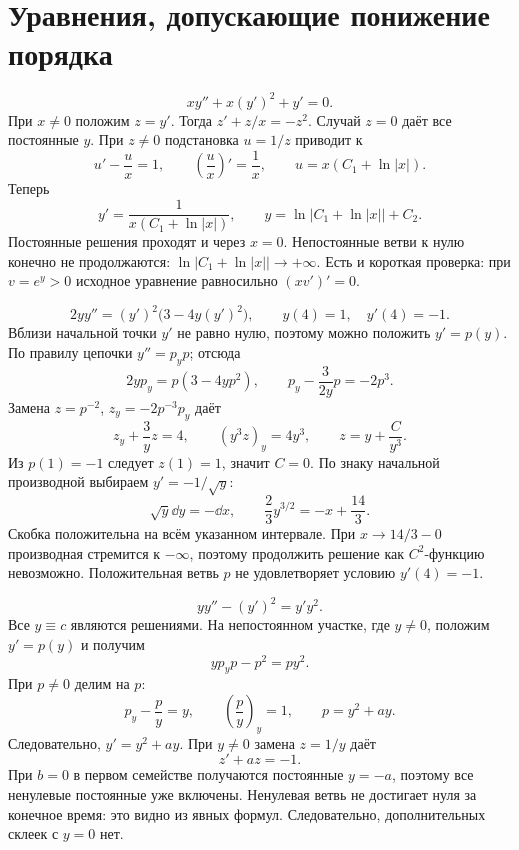 \section{Уравнения, допускающие понижение порядка}

\[
 xy''+x(y')^2+y'=0.
\]
При $x\ne0$ положим $z=y'$. Тогда $z'+z/x=-z^2$.
Случай $z=0$ даёт все постоянные $y$. При $z\ne0$ подстановка
$u=1/z$ приводит к
\[
 u'-\frac ux=1,\qquad
 \left(\frac ux\right)'=\frac1x,\qquad u=x(C_1+\ln|x|).
\]
Теперь
\[
 y'=\frac1{x(C_1+\ln|x|)},\qquad
 y=\ln|C_1+\ln|x||+C_2.
\]
Постоянные решения проходят и через $x=0$. Непостоянные ветви к нулю
конечно не продолжаются: $\ln|C_1+\ln|x||\to+\infty$.
Есть и короткая проверка: при $v=e^y>0$ исходное уравнение
равносильно $(xv')'=0$.

\[
 2yy''=(y')^2\bigl(3-4y(y')^2\bigr),\qquad y(4)=1,\quad y'(4)=-1.
\]
Вблизи начальной точки $y'$ не равно нулю, поэтому можно положить
$y'=p(y)$. По правилу цепочки $y''=p_y p$; отсюда
\[
 2y p_y=p(3-4yp^2),\qquad
 p_y-\frac3{2y}p=-2p^3.
\]
Замена $z=p^{-2}$, $z_y=-2p^{-3}p_y$ даёт
\[
 z_y+\frac3y z=4,\qquad (y^3z)_y=4y^3,
 \qquad z=y+\frac C{y^3}.
\]
Из $p(1)=-1$ следует $z(1)=1$, значит $C=0$.
По знаку начальной производной выбираем $y'=-1/\sqrt y$:
\[
 \sqrt y\dd y=-\dd x,\qquad
 \frac23y^{3/2}=-x+\frac{14}3.
\]
Скобка положительна на всём указанном интервале. При $x\to14/3-0$
производная стремится к $-\infty$, поэтому продолжить решение как
$C^2$-функцию невозможно. Положительная ветвь $p$ не удовлетворяет
условию $y'(4)=-1$.

\[
 yy''-(y')^2=y'y^2.
\]
Все $y\equiv c$ являются решениями. На непостоянном участке, где $y\ne0$,
положим $y'=p(y)$ и получим
\[
 y p_y p-p^2=py^2.
\]
При $p\ne0$ делим на $p$:
\[
 p_y-\frac py=y,\qquad
 \left(\frac py\right)_y=1,\qquad p=y^2+ay.
\]
Следовательно, $y'=y^2+ay$. При $y\ne0$ замена $z=1/y$ даёт
\[
 z'+az=-1.
\]
При $b=0$ в первом семействе получаются постоянные $y=-a$, поэтому
все ненулевые постоянные уже включены. Ненулевая ветвь не достигает
нуля за конечное время: это видно из явных формул. Следовательно,
дополнительных склеек с $y=0$ нет.

